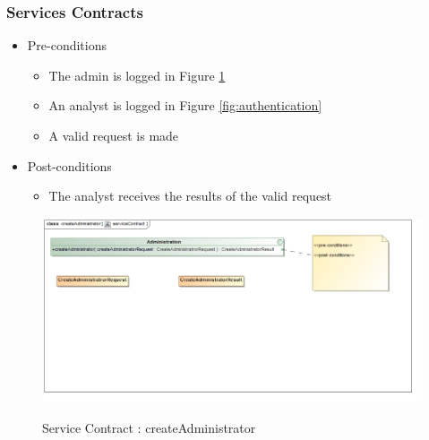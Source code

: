 \documentclass{article}
\begin{document}
		\subsubsection{Services Contracts}
		\begin{itemize}
			\item Pre-conditions
				\begin{itemize}
					\item The admin is logged in Figure \ref{fig:createAdmin}
					\item An analyst is logged in Figure \ref{fig:authentication}
					\item A valid request is made
				\end{itemize}
			\item Post-conditions
				\begin{itemize}
					\item The analyst receives the results of the valid request
				\end{itemize}
		\end{itemize}
		\begin{figure}[H]
		\includegraphics[width=\textwidth]{images/class__createAdministrator__serviceContract.jpg}  \\
		\caption{Service Contract : createAdministrator}
		\label{fig:createAdmin}
		\end{figure}
		
		\pagebreak
\end{document}
